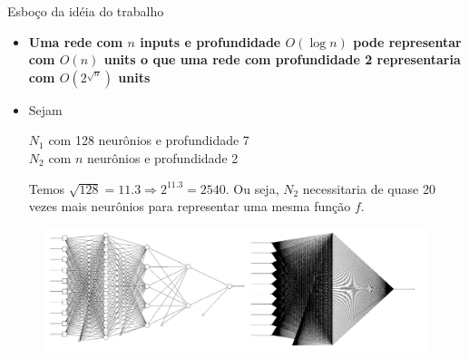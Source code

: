 \documentclass[tikz,10pt]{beamer}
\begin{document}
	\begin{frame}{Esboço da idéia do trabalho}
		
		\begin{itemize}
			\item \textbf{ Uma rede com $n$ inputs e profundidade $O(\log{n})$ pode representar com $O(n)$ units o que uma rede com profundidade 2 representaria com $O(2^{\sqrt{n}})$ units}
			\item Sejam \begin{cases}
				$N_1$ com 128 neurônios e profundidade 7 \\
				$N_2$ com $n$ neurônios e profundidade 2
			\end{cases}
			
			Temos $\sqrt{128} = 11.3 \Rightarrow 2^{11.3} = 2540$. Ou seja, $N_2$ necessitaria de quase 20 vezes mais neurônios para representar uma mesma função $f$.
		\end{itemize}
		
		
		\begin{figure}
			\centering
			\includegraphics[scale=0.33]{images/shallowdeep.png}
		\end{figure}
		
		
	\end{frame}
	
\end{document}
